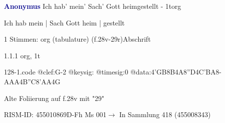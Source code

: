 \documentclass[twocolumn]{book}
\begin{document}
\par \vspace{7pt} \textcolor{darkblue}{\textbf{Anonymus  }}\hfillplus{\textbf{[128]}}\newline Ich hab' mein' Sach' Gott heimgestellt - 1t\newline org
\par \begin{itshape}[f.28v, at left:] Ich hab mein | Sach Gott heim | gestellt\end{itshape} 
\par \textcolor{darkblue}{}  1 Stimmen: org (tabulature)  (f.28v-29r)\newline Abschrift
\par 1.1.1  org, 1t  
\begin{filecontents*}{128-1.code}
@clef:G-2
@keysig:
@timesig:0
@data:4'GB8B4A8''D4C'BA8-{AAA}4B''C{8'AA}4G
\end{filecontents*}
\newline
%
\par Alte Foliierung auf f.28v mit "29"
\par RISM-ID: 455010869\newline D-Fh  Ms 001\newline $\rightarrow$ In Sammlung 418 (455008343)
      
\end{document}
